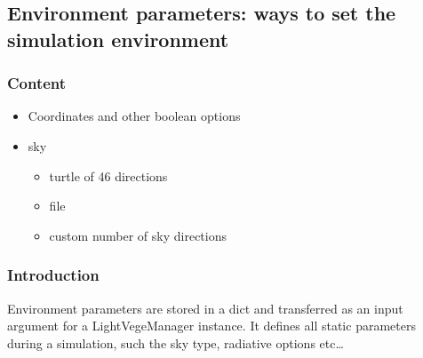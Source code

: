 \documentclass[letterpaper,10pt,english]{sphinxmanual}
\begin{document}
\subsection{Environment parameters: ways to set the simulation environment}
\label{\detokenize{environment_parameters:Environment-parameters:-ways-to-set-the-simulation-environment}}\label{\detokenize{environment_parameters::doc}}

\subsubsection{Content}
\label{\detokenize{environment_parameters:Content}}\begin{itemize}
\item {} 
\sphinxAtStartPar
Coordinates and other boolean options

\item {} 
\sphinxAtStartPar
sky
\begin{itemize}
\item {} 
\sphinxAtStartPar
turtle of 46 directions

\item {} 
\sphinxAtStartPar
file

\item {} 
\sphinxAtStartPar
custom number of sky directions

\end{itemize}

\end{itemize}


\subsubsection{Introduction}
\label{\detokenize{environment_parameters:Introduction}}
\sphinxAtStartPar
Environment parameters are stored in a dict and transferred as an input argument for a LightVegeManager instance. It defines all static parameters during a simulation, such the sky type, radiative options etc…
\end{document}
